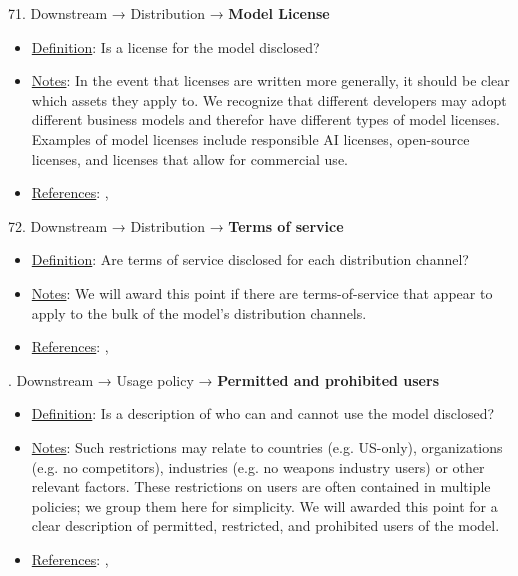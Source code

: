 71. Downstream → Distribution → \textbf{Model License}
\vspace{-\parskip}
\begin{itemize}
	\item
	\underline{Definition}: Is a license for the model disclosed?
	\item
	\underline{Notes}: In the event that licenses are written more generally, it should be clear which assets they apply to. We recognize that different developers may adopt different business models and therefor have different types of model licenses. Examples of model licenses include responsible AI licenses, open-source licenses, and licenses that allow for commercial use.
	\item
	\underline{References}: \citet{Pistilli2023}, \citet{chen2023investigation}
\end{itemize} \vspace{\baselineskip}


72. Downstream → Distribution → \textbf{Terms of service}
\vspace{-\parskip}
\begin{itemize}
	\item
	\underline{Definition}: Are terms of service disclosed for each distribution channel?
	\item
	\underline{Notes}: We will award this point if there are terms-of-service that appear to apply to the bulk of the model’s distribution channels.
	\item
	\underline{References}: \citet{rakova2022termsweservewith}, \citet{liu2021identifying}
\end{itemize} \vspace{\baselineskip}


. Downstream → Usage policy → \textbf{Permitted and prohibited users}
\vspace{-\parskip}
\begin{itemize}
	\item
	\underline{Definition}: Is a description of who can and cannot use the model disclosed?
	\item
	\underline{Notes}: Such restrictions may relate to countries (e.g. US-only), organizations (e.g. no competitors), industries (e.g. no weapons industry users) or other relevant factors. These restrictions on users are often contained in multiple policies; we group them here for simplicity. We will awarded this point for a clear description of permitted, restricted, and prohibited users of the model.
	\item
	\underline{References}: \citet{cohere2022}, \citet{meta2023}
\end{itemize} \vspace{\baselineskip}


